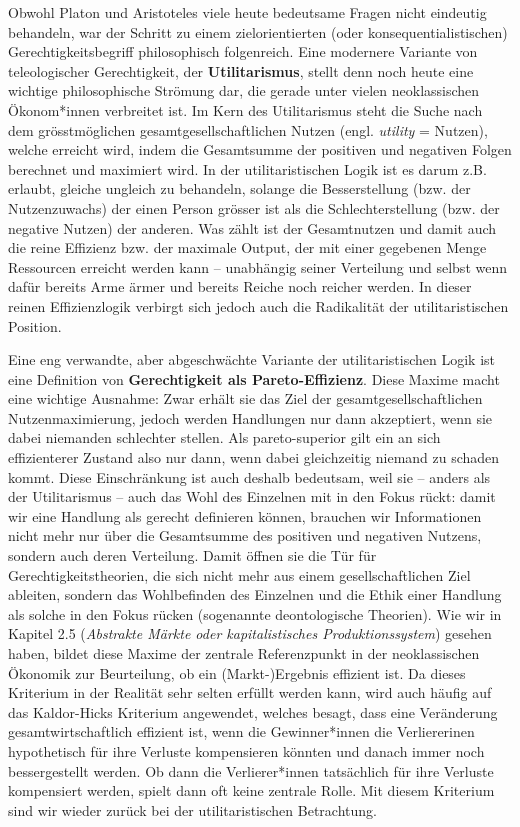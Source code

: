 \documentclass[
  nswissgerman,
  a4paper,
  DIV=11,
  numbers=noendperiod,
  oneside,
  openany]{scrreprt}
\begin{document}
Obwohl Platon und Aristoteles viele heute bedeutsame Fragen nicht
eindeutig behandeln, war der Schritt zu einem zielorientierten (oder
konsequentialistischen) Gerechtigkeitsbegriff philosophisch folgenreich.
Eine modernere Variante von teleologischer Gerechtigkeit, der
\textbf{Utilitarismus}, stellt denn noch heute eine wichtige
philosophische Strömung dar, die gerade unter vielen neoklassischen
Ökonom*innen verbreitet ist. Im Kern des Utilitarismus steht die Suche
nach dem grösstmöglichen gesamtgesellschaftlichen Nutzen (engl.
\emph{utility} = Nutzen), welche erreicht wird, indem die Gesamtsumme
der positiven und negativen Folgen berechnet und maximiert wird. In der
utilitaristischen Logik ist es darum z.B. erlaubt, gleiche ungleich zu
behandeln, solange die Besserstellung (bzw. der Nutzenzuwachs) der einen
Person grösser ist als die Schlechterstellung (bzw. der negative Nutzen)
der anderen. Was zählt ist der Gesamtnutzen und damit auch die reine
Effizienz bzw. der maximale Output, der mit einer gegebenen Menge
Ressourcen erreicht werden kann -- unabhängig seiner Verteilung und
selbst wenn dafür bereits Arme ärmer und bereits Reiche noch reicher
werden. In dieser reinen Effizienzlogik verbirgt sich jedoch auch die
Radikalität der utilitaristischen Position.

Eine eng verwandte, aber abgeschwächte Variante der utilitaristischen
Logik ist eine Definition von \textbf{Gerechtigkeit als
Pareto-Effizienz}. Diese Maxime macht eine wichtige Ausnahme: Zwar
erhält sie das Ziel der gesamtgesellschaftlichen Nutzenmaximierung,
jedoch werden Handlungen nur dann akzeptiert, wenn sie dabei niemanden
schlechter stellen. Als pareto-superior gilt ein an sich effizienterer
Zustand also nur dann, wenn dabei gleichzeitig niemand zu schaden kommt.
Diese Einschränkung ist auch deshalb bedeutsam, weil sie -- anders als
der Utilitarismus -- auch das Wohl des Einzelnen mit in den Fokus rückt:
damit wir eine Handlung als gerecht definieren können, brauchen wir
Informationen nicht mehr nur über die Gesamtsumme des positiven und
negativen Nutzens, sondern auch deren Verteilung. Damit öffnen sie die
Tür für Gerechtigkeitstheorien, die sich nicht mehr aus einem
gesellschaftlichen Ziel ableiten, sondern das Wohlbefinden des Einzelnen
und die Ethik einer Handlung als solche in den Fokus rücken (sogenannte
deontologische Theorien). Wie wir in Kapitel 2.5 (\emph{Abstrakte Märkte
oder kapitalistisches Produktionssystem}) gesehen haben, bildet diese
Maxime der zentrale Referenzpunkt in der neoklassischen Ökonomik zur
Beurteilung, ob ein (Markt-)Ergebnis effizient ist. Da dieses Kriterium
in der Realität sehr selten erfüllt werden kann, wird auch häufig auf
das Kaldor-Hicks Kriterium angewendet, welches besagt, dass eine
Veränderung gesamtwirtschaftlich effizient ist, wenn die Gewinner*innen
die Verliererinen hypothetisch für ihre Verluste kompensieren könnten
und danach immer noch bessergestellt werden. Ob dann die Verlierer*innen
tatsächlich für ihre Verluste kompensiert werden, spielt dann oft keine
zentrale Rolle. Mit diesem Kriterium sind wir wieder zurück bei der
utilitaristischen Betrachtung.
\end{document}
